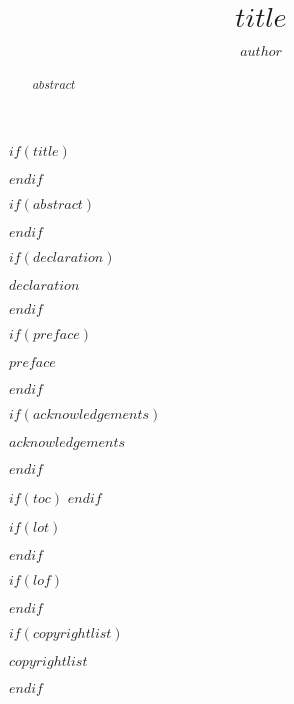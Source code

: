 \documentclass[11pt,a4paper,titlepage,twoside,openright]{style/unimelbthesis}
\title{$title$}
\author{$author$}
\makeatletter
\newcommand{\verbatimfont}[1]{\renewcommand{\verbatim@font}{\ttfamily#1}}
\makeatother
\begin{document}

\verbatimfont{\scriptsize}

\begin{frontmatter}

\frontmatterheadings


$if(title)$
  \maketitle
$endif$


$if(abstract)$
  \begin{abstract}
    $abstract$
  \end{abstract}
$endif$


$if(declaration)$
  \begin{declaration}
    $declaration$
  \end{declaration}
$endif$


$if(preface)$
  \begin{preface}
    $preface$
  \end{preface}
$endif$


$if(acknowledgements)$
  \begin{acknowledgements}
    $acknowledgements$
  \end{acknowledgements}
$endif$


$if(toc)$
  \hypersetup{linkcolor=$if(toccolor)$$toccolor$$else$black$endif$}
  \setcounter{tocdepth}{$toc-depth$}
  \tableofcontents
$endif$


$if(lot)$
  \listoftables
$endif$


$if(lof)$
  \listoffigures
$endif$


$if(copyrightlist)$
  \begin{copyrightlist}
    $copyrightlist$
  \end{copyrightlist}
$endif$

\end{frontmatter}
\end{document}
